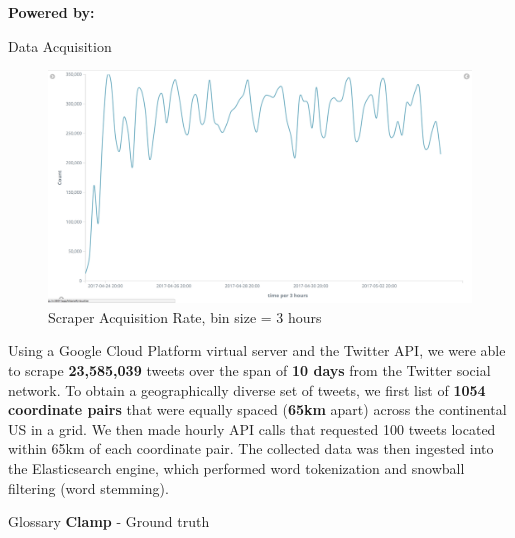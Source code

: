 \documentclass[final]{beamer}
\newlength{\onecolwid}
\begin{document}
\begin{frame}[t]
\begin{columns}[t]
\begin{column}{\onecolwid}
\begin{block}{\textbf{Powered by:}}


\end{block}


\begin{block}{Data Acquisition}
\begin{figure}[h]

\begin{center}\includegraphics[width=0.9\linewidth]{dacq} \end{center}
\caption{Scraper Acquisition Rate, bin size = 3 hours}
\end{figure}
 Using a Google Cloud Platform virtual server and the Twitter API, we were able to scrape \textbf{23,585,039} tweets over the span of \textbf{10 days} from the Twitter social network. To obtain a geographically diverse set of tweets, we first list of \textbf{1054 coordinate pairs} that were equally spaced (\textbf{65km} apart) across the continental US in a grid. We then made hourly API calls that requested 100 tweets located within 65km of each coordinate pair. The collected data was then ingested into the Elasticsearch engine, which performed word tokenization and snowball filtering (word stemming). 


\end{block}

\begin{alertblock}{Glossary}
\textbf{Clamp} - Ground truth
\end{alertblock}
\end{column} %


\end{columns}
\end{frame}
\end{document}
